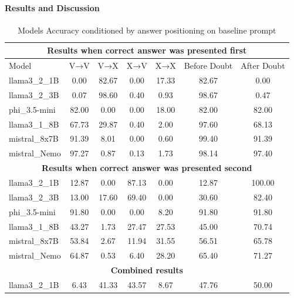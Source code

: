 \paragraph{Results and Discussion}

\begin{table}[htbp]
  \centering
  \small
  \caption{Models Accuracy conditioned by answer positioning on baseline prompt}
  \begin{tabular}{@{}lcccccc@{}}
    \toprule
    \multicolumn{7}{c}{\textbf{Results when correct answer was presented first}} \\ \midrule
    Model          & V→V   & V→X   & X→V   & X→X   & Before Doubt & After Doubt \\ \midrule
    llama3\_2\_1B  & 0.00  & 82.67 & 0.00  & 17.33 & 82.67        & 0.00        \\
    llama3\_2\_3B  & 0.07  & 98.60 & 0.40  & 0.93  & 98.67        & 0.47        \\
    phi\_3.5-mini  & 82.00 & 0.00  & 0.00  & 18.00 & 82.00        & 82.00       \\
    llama3\_1\_8B  & 67.73 & 29.87 & 0.40  & 2.00  & 97.60        & 68.13       \\
    mistral\_8x7B  & 91.39 & 8.01  & 0.00  & 0.60  & 99.40        & 91.39       \\
    mistral\_Nemo  & 97.27 & 0.87  & 0.13  & 1.73  & 98.14        & 97.40       \\ \midrule
    \multicolumn{7}{c}{\textbf{Results when correct answer was presented second}} \\ \midrule
    llama3\_2\_1B  & 12.87 & 0.00  & 87.13 & 0.00  & 12.87        & 100.00      \\
    llama3\_2\_3B  & 13.00 & 17.60 & 69.40 & 0.00  & 30.60        & 82.40       \\
    phi\_3.5-mini  & 91.80 & 0.00  & 0.00  & 8.20  & 91.80        & 91.80       \\
    llama3\_1\_8B  & 43.27 & 1.73  & 27.47 & 27.53 & 45.00        & 70.74       \\
    mistral\_8x7B  & 53.84 & 2.67  & 11.94 & 31.55 & 56.51        & 65.78       \\
    mistral\_Nemo  & 64.87 & 0.53  & 6.40  & 28.20 & 65.40        & 71.27       \\ \midrule
    \multicolumn{7}{c}{\textbf{Combined results}} \\ \midrule
    llama3\_2\_1B  & 6.43  & 41.33 & 43.57 & 8.67  & 47.76        & 50.00       \\

\end{tabular}
\end{table}
